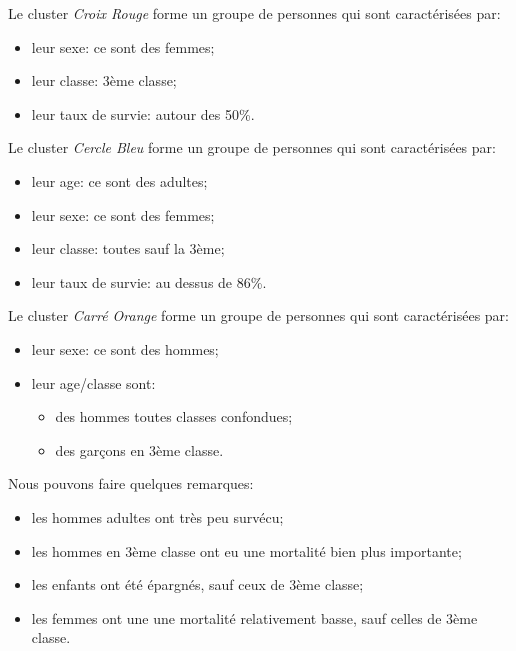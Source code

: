 \documentclass[11pt, a4paper]{article}
\begin{document}
Le cluster \textit{Croix Rouge} forme un groupe de personnes qui sont caractérisées par:
\begin{itemize}
    \item leur sexe: ce sont des femmes;
    \item leur classe: 3ème classe;
    \item leur taux de survie: autour des 50\%. \\
\end{itemize}

Le cluster \textit{Cercle Bleu} forme un groupe de personnes qui sont caractérisées par:
\begin{itemize}
    \item leur age: ce sont des adultes;
    \item leur sexe: ce sont des femmes;
    \item leur classe: toutes sauf la 3ème;
    \item leur taux de survie: au dessus de 86\%. \\
\end{itemize}

Le cluster \textit{Carré Orange} forme un groupe de personnes qui sont caractérisées par:
\begin{itemize}
    \item leur sexe: ce sont des hommes;
    \item leur age/classe sont:
    \begin{itemize}
        \item des hommes toutes classes confondues;
        \item des garçons en 3ème classe. \\
    \end{itemize}
\end{itemize}

Nous pouvons faire quelques remarques:
\begin{itemize}
    \item les hommes adultes ont très peu survécu;
    \item les hommes en 3ème classe ont eu une mortalité bien plus importante;
    \item les enfants ont été épargnés, sauf ceux de 3ème classe;
    \item les femmes ont une une mortalité relativement basse, sauf celles de 3ème classe.
\end{itemize}

\newpage

\end{document}

